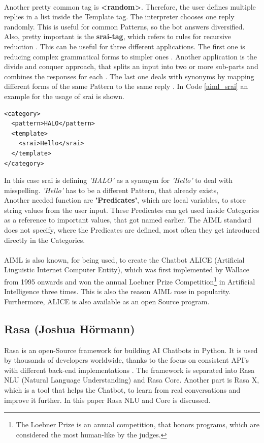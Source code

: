 \documentclass[10pt,final,journal,a4paper,oneside,twocolumn]{IEEEtran}
\begin{document}
\\
Another pretty common tag is \textbf{<random>}. Therefore, the user defines multiple replies in a list inside the Template tag\cite{b20}. The interpreter chooses one reply randomly. This is useful for common Patterns, so the bot answers diversified.\\
Also, pretty important is the \textbf{srai-tag}, which refers to rules for recursive reduction \cite{b20}. This can be useful for three different applications. The first one is reducing complex grammatical forms to simpler ones \cite{b21}. Another application is the divide and conquer approach, that splits an input into two or more sub-parts and combines the responses for each \cite{b21}. The last one deals with synonyms by mapping different forms of the same Pattern to the same reply \cite{b21}. In Code \ref{aiml_srai} an example for the usage of srai is shown. 
\begin{lstlisting}[caption={Example for the srai-tag (based on \cite{b21}).},label=aiml_srai,lineskip=1pt]
<category>
  <pattern>HALO</pattern>
  <template>
    <srai>Hello</srai>
  </template>
</category>
\end{lstlisting}
In this case srai is defining \textit{'HALO'} as a synonym for \textit{'Hello'} to deal with misspelling. \textit{'Hello'} has to be a different Pattern, that already exists, \\
Another needed function are \textbf{'Predicates'}, which are local variables, to store string values from the user input. These Predicates can get used inside Categories as a reference to important values, that got named earlier. The AIML standard does not specify, where the Predicates are defined, most often they get introduced directly in the Categories.\\
\\
AIML is also known, for being used, to create the Chatbot ALICE (Artificial Linguistic Internet Computer Entity), which was first implemented by Wallace from 1995 onwards and won the annual Loebner Prize Competition\footnote{The Loebner Prize is an annual competition, that honors programs, which are considered the most human-like by the judges.} in Artificial Intelligence three times. This is also the reason AIML rose in popularity. Furthermore, ALICE is also available as an open Source program.

\subsection{Rasa (Joshua Hörmann)}
Rasa is an open-Source framework for building AI Chatbots in Python. It is used by thousands of developers worldwide, thanks to the focus on consistent API's with different back-end implementations \cite{b22}. The framework is separated into Rasa NLU (Natural Language Understanding) and Rasa Core. Another part is Rasa X, which is a tool that helps the Chatbot, to learn from real conversations and improve it further. In this paper Rasa NLU and Core is discussed.
\\
\end{document}
